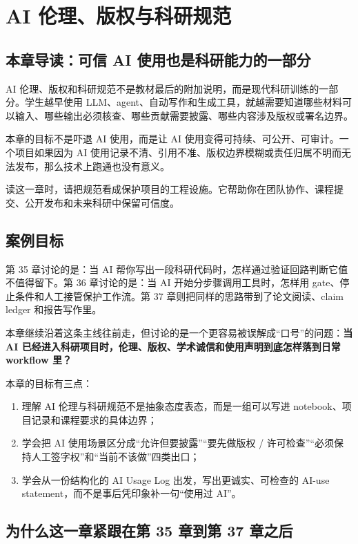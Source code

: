 \chapter{AI 伦理、版权与科研规范}

\section{本章导读：可信 AI 使用也是科研能力的一部分}

AI 伦理、版权和科研规范不是教材最后的附加说明，而是现代科研训练的一部分。学生越早使用 LLM、agent、自动写作和生成工具，就越需要知道哪些材料可以输入、哪些输出必须核查、哪些贡献需要披露、哪些内容涉及版权或署名边界。

本章的目标不是吓退 AI 使用，而是让 AI 使用变得可持续、可公开、可审计。一个项目如果因为 AI 使用记录不清、引用不准、版权边界模糊或责任归属不明而无法发布，那么技术上跑通也没有意义。

读这一章时，请把规范看成保护项目的工程设施。它帮助你在团队协作、课程提交、公开发布和未来科研中保留可信度。

\section{案例目标}

第 35 章讨论的是：当 AI 帮你写出一段科研代码时，怎样通过验证回路判断它值不值得留下。第 36 章讨论的是：当 AI 开始分步骤调用工具时，怎样用 gate、停止条件和人工接管保护工作流。第 37 章则把同样的思路带到了论文阅读、claim ledger 和报告写作里。

本章继续沿着这条主线往前走，但讨论的是一个更容易被误解成“口号”的问题：\textbf{当 AI 已经进入科研项目时，伦理、版权、学术诚信和使用声明到底怎样落到日常 workflow 里？}

本章的目标有三点：

\begin{enumerate}
    \item 理解 AI 伦理与科研规范不是抽象态度表态，而是一组可以写进 notebook、项目记录和课程要求的具体边界；
    \item 学会把 AI 使用场景区分成“允许但要披露”“要先做版权 / 许可检查”“必须保持人工签字权”和“当前不该做”四类出口；
    \item 学会从一份结构化的 AI Usage Log 出发，写出更诚实、可检查的 AI-use statement，而不是事后凭印象补一句“使用过 AI”。
\end{enumerate}

\section{为什么这一章紧跟在第 35 章到第 37 章之后}

